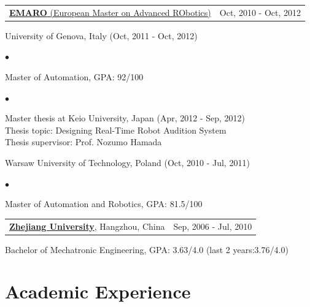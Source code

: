 \documentclass[margin,line]{res}
\newenvironment{list1}{
  \begin{list}{\ding{113}}{%
      \setlength{\itemsep}{0in}
      \setlength{\parsep}{0in} \setlength{\parskip}{0in}
      \setlength{\topsep}{0in} \setlength{\partopsep}{0in} 
      \setlength{\leftmargin}{0.17in}}}{\end{list}}
\newenvironment{list2}{
  \begin{list}{$\bullet$}{%
      \setlength{\itemsep}{0in}
      \setlength{\parsep}{0in} \setlength{\parskip}{0in}
      \setlength{\topsep}{0in} \setlength{\partopsep}{0in} 
      \setlength{\leftmargin}{0.2in}}}{\end{list}}
\begin{document}
\begin{resume}
\begin{tabularx}{\textwidth}{X r}
\href{http://emaro.irccyn.ec-nantes.fr/}{{\bf EMARO} (European Master on Advanced RObotics)} &Oct, 2010 - Oct, 2012\\
\end{tabularx}
\vspace*{-.1in}
\begin{list1}
\item[] University of Genova, Italy (Oct, 2011 - Oct, 2012)
\begin{list2}
\vspace*{.05in}
\item Master of Automation, GPA: 92/100
\end{list2}
\begin{list2}
\vspace*{.05in}
\item Master thesis at Keio University, Japan (Apr, 2012 - Sep, 2012)\\
Thesis topic: Designing Real-Time Robot Audition System\\
Thesis supervisor: Prof. Nozumo Hamada
\end{list2}
\end{list1}
\begin{list1}
\item[] Warsaw University of Technology, Poland (Oct, 2010 - Jul, 2011)
\begin{list2}
\vspace*{.05in}
\item Master of Automation and Robotics, GPA: 81.5/100
\end{list2}
\end{list1}

\begin{tabularx}{\textwidth}{X r}
\href{http://www.zju.edu.cn/english/}{{\bf Zhejiang University}}, Hangzhou, China   &Sep, 2006 - Jul, 2010\\
\end{tabularx}
\vspace*{-.1in}
\begin{list1}
\item[] Bachelor of Mechatronic Engineering, GPA: 3.63/4.0 (last 2 years:3.76/4.0)
\end{list1}

\section{\sc Academic Experience}


\end{resume}
\end{document}
